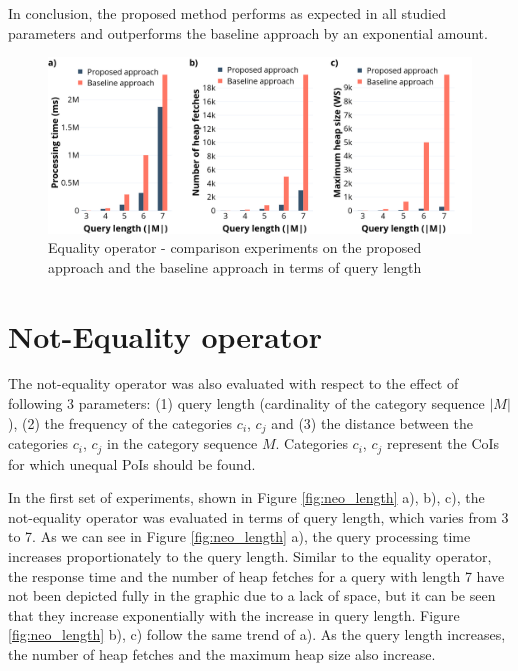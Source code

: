 In conclusion, the proposed method performs as expected in all studied parameters and outperforms the baseline approach by an exponential amount. 

\begin{figure}[H]
	\includegraphics[scale=0.33]{images/eo2.png}
	\centering
	\caption{Equality operator - comparison experiments on the proposed approach and the baseline approach in terms of query length}
	\label{fig:eo2_length}
\end{figure}


\section{Not-Equality operator}
\label{sec:experimentsNEO}

The not-equality operator was also evaluated with respect to the effect of following 3 parameters: (1) query length (cardinality of the category sequence $|M|$), (2) the frequency of the categories $c_i$, $c_j$ and (3) the distance between the categories $c_i$, $c_j$ in the category sequence $M$. Categories $c_i$, $c_j$ represent the CoIs for which unequal PoIs should be found.

In the first set of experiments, shown in Figure \ref{fig:neo_length} a), b), c), the not-equality operator was evaluated in terms of query length, which varies from 3 to 7. As we can see in Figure \ref{fig:neo_length} a), the query processing time increases proportionately to the query length. Similar to the equality operator, the response time and the number of heap fetches for a query with length 7 have not been depicted fully in the graphic due to a lack of space, but it can be seen that they increase exponentially with the increase in query length. Figure \ref{fig:neo_length} b), c) follow the same trend of a). As the query length increases, the number of heap fetches and the maximum heap size also increase.

